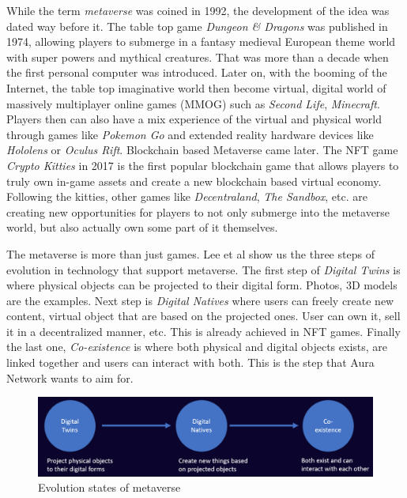 \documentclass[12pt]{article}
\begin{document}
While the term \emph{metaverse} was coined in 1992, the development of the idea was dated way before it. The table top game \emph{Dungeon \& Dragons} was published in 1974, allowing players to submerge in a fantasy medieval European theme world with super powers and mythical creatures. That was more than a decade when the first personal computer was introduced. Later on, with the booming of the Internet, the table top imaginative world then become virtual, digital world of massively multiplayer online games (MMOG) such as \emph{Second Life}, \emph{Minecraft}. Players then can also have a mix experience of the virtual and physical world through games like \emph{Pokemon Go} and extended reality hardware devices like \emph{Hololens} or \emph{Oculus Rift}. Blockchain based Metaverse came later. The NFT game \emph{Crypto Kitties} in 2017 is the first popular blockchain game that allows players to truly own in-game assets and create a new blockchain based virtual economy. Following the kitties, other games like \emph{Decentraland}, \emph{The Sandbox}, etc. are creating new opportunities for players to not only submerge into the metaverse world, but also actually own some part of it themselves.

The metaverse is more than just games. Lee et al \cite{lee2021all} show us the three steps of evolution in technology that support metaverse. The first step of \emph{Digital Twins} is where physical objects can be projected to their digital form. Photos, 3D models are the examples. Next step is \emph{Digital Natives} where users can freely create new content, virtual object that are based on the projected ones. User can own it, sell it in a decentralized manner, etc. This is already achieved in NFT games. Finally the last one, \emph{Co-existence} is where both physical and digital objects exists, are linked together and users can interact with both. This is the step that Aura Network wants to aim for.   

\begin{figure}[ht]
\label{fig:metaverse}
\includegraphics[width=14cm]{img/metaverse.png}
\centering
\caption{Evolution states of metaverse \cite{lee2021all}}
\end{figure}
\end{document}
